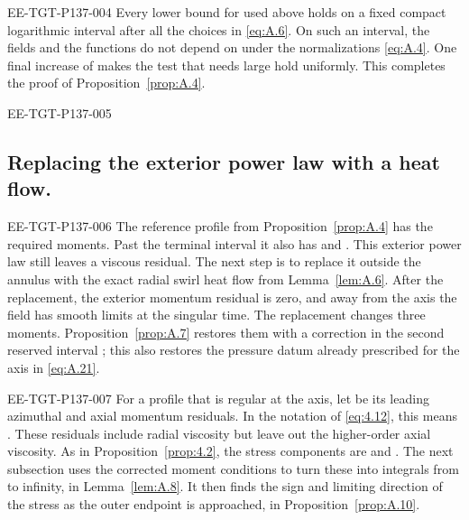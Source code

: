 \begin{EESegment}{EE-TGT-P137-004}
Every lower bound for  used above holds on a fixed compact logarithmic interval after all the
choices in \eqref{eq:A.6}. On such an interval, the fields and the functions
 do not depend on  under the normalizations
\eqref{eq:A.4}. One final increase of  makes the test that needs large
 hold uniformly. This completes the proof of Proposition~\ref{prop:A.4}.
\end{EESegment}

\begin{EESegment}{EE-TGT-P137-005}
\subsection{Replacing the exterior power law with a heat flow.}\label{sec:A.6}
\end{EESegment}
\begin{EESegment}{EE-TGT-P137-006}
The reference profile  from Proposition~\ref{prop:A.4} has the required moments. Past the
terminal interval it also has  and
. This exterior power law
 still leaves a viscous residual. The next step is to replace it outside the annulus
with the exact radial swirl heat flow  from Lemma~\ref{lem:A.6}. After the replacement, the
exterior momentum residual is zero, and away from the axis the field has smooth limits at the singular time. The
replacement changes three moments. Proposition~\ref{prop:A.7} restores them with a correction in the second reserved
interval ; this also restores the pressure datum
 already prescribed for the axis in \eqref{eq:A.21}.
\end{EESegment}

\begin{EESegment}{EE-TGT-P137-007}
For a profile that is regular at the axis, let
 be its leading azimuthal and axial momentum residuals.
In the notation of \eqref{eq:4.12}, this means . These residuals
include radial viscosity but leave out the higher-order axial viscosity. As in Proposition~\ref{prop:4.2}, the stress
components are  and
. The next subsection uses the corrected moment
conditions to turn these into integrals from  to infinity, in Lemma~\ref{lem:A.8}. It then finds
the sign and limiting direction of the stress as the outer endpoint is approached, in Proposition~\ref{prop:A.10}.
\end{EESegment}

